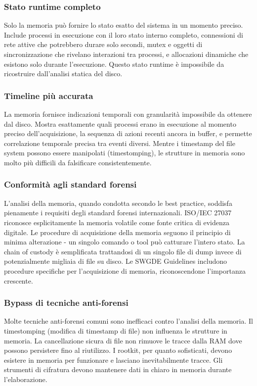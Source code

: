 \subsubsection{Stato runtime completo}
Solo la memoria può fornire lo stato esatto del sistema in un momento preciso. Include processi in esecuzione con il loro stato interno completo, connessioni di rete attive che potrebbero durare solo secondi, mutex e oggetti di sincronizzazione che rivelano interazioni tra processi, e allocazioni dinamiche che esistono solo durante l'esecuzione. Questo stato runtime è impossibile da ricostruire dall'analisi statica del disco.

\subsubsection{Timeline più accurata}
La memoria fornisce indicazioni temporali con granularità impossibile da ottenere dal disco. Mostra esattamente quali processi erano in esecuzione al momento preciso dell'acquisizione, la sequenza di azioni recenti ancora in buffer, e permette correlazione temporale precisa tra eventi diversi. Mentre i timestamp del file system possono essere manipolati (timestomping), le strutture in memoria sono molto più difficili da falsificare consistentemente.

\subsubsection{Conformità agli standard forensi}
L'analisi della memoria, quando condotta secondo le best practice, soddisfa pienamente i requisiti degli standard forensi internazionali. ISO/IEC 27037 \cite{iso27037} riconosce esplicitamente la memoria volatile come fonte critica di evidenza digitale. Le procedure di acquisizione della memoria seguono il principio di minima alterazione - un singolo comando o tool può catturare l'intero stato. La chain of custody è semplificata trattandosi di un singolo file di dump invece di potenzialmente migliaia di file su disco. Le SWGDE Guidelines \cite{swgde2022} includono procedure specifiche per l'acquisizione di memoria, riconoscendone l'importanza crescente.

\subsubsection{Bypass di tecniche anti-forensi}
Molte tecniche anti-forensi comuni sono inefficaci contro l'analisi della memoria. Il timestomping (modifica di timestamp di file) non influenza le strutture in memoria. La cancellazione sicura di file non rimuove le tracce dalla RAM dove possono persistere fino al riutilizzo. I rootkit, per quanto sofisticati, devono esistere in memoria per funzionare e lasciano inevitabilmente tracce. Gli strumenti di cifratura devono mantenere dati in chiaro in memoria durante l'elaborazione.

